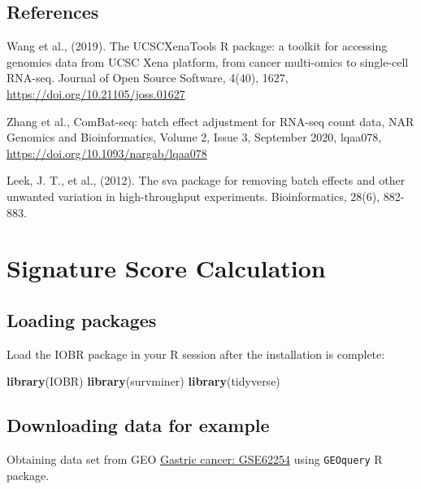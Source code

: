 \documentclass[
  12pt,
]{book}
\newenvironment{Shaded}{\begin{snugshade}}{\end{snugshade}}
\newcommand{\FunctionTok}[1]{\textcolor[rgb]{0.13,0.29,0.53}{\textbf{#1}}}
\newcommand{\NormalTok}[1]{#1}
\begin{document}
\hypertarget{references}{%
\section{References}\label{references}}

Wang et al., (2019). The UCSCXenaTools R package: a toolkit for accessing genomics data from UCSC Xena platform, from cancer multi-omics to single-cell RNA-seq. Journal of Open Source Software, 4(40), 1627, \url{https://doi.org/10.21105/joss.01627}

Zhang et al., ComBat-seq: batch effect adjustment for RNA-seq count data, NAR Genomics and Bioinformatics, Volume 2, Issue 3, September 2020, lqaa078, \url{https://doi.org/10.1093/nargab/lqaa078}

Leek, J. T., et al., (2012). The sva package for removing batch effects and other unwanted variation in high-throughput experiments. Bioinformatics, 28(6), 882-883.

\hypertarget{signature-score-calculation}{%
\chapter{\texorpdfstring{\textbf{Signature Score Calculation}}{Signature Score Calculation}}\label{signature-score-calculation}}

\hypertarget{loading-packages-1}{%
\section{Loading packages}\label{loading-packages-1}}

Load the IOBR package in your R session after the installation is complete:

\begin{Shaded}
\begin{Highlighting}[]
\FunctionTok{library}\NormalTok{(IOBR)}
\FunctionTok{library}\NormalTok{(survminer)}
\FunctionTok{library}\NormalTok{(tidyverse)}
\end{Highlighting}
\end{Shaded}

\hypertarget{downloading-data-for-example}{%
\section{Downloading data for example}\label{downloading-data-for-example}}

Obtaining data set from GEO \href{https://pubmed.ncbi.nlm.nih.gov/25894828/}{Gastric cancer: GSE62254} using \texttt{GEOquery} R package.
\end{document}
